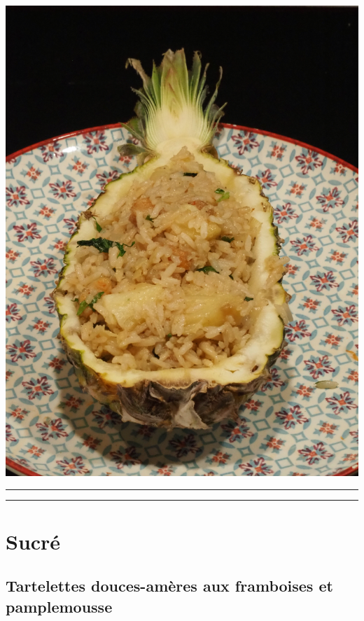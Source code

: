 \documentclass[]{book}
\begin{document}
\begin{center}\includegraphics[width=0.9\linewidth]{photos/riz_saute} \end{center}

\begin{center}\rule{0.5\linewidth}{0.5pt}\end{center}

\begin{center}\rule{0.5\linewidth}{0.5pt}\end{center}

\section*{Sucré}\label{sucruxe9}

\subsection*{\texorpdfstring{{Tartelettes douces-amères aux framboises
et
pamplemousse}}{Tartelettes douces-amères aux framboises et pamplemousse}}\label{tartelettes-douces-amuxe8res-aux-framboises-et-pamplemousse}
\end{document}
